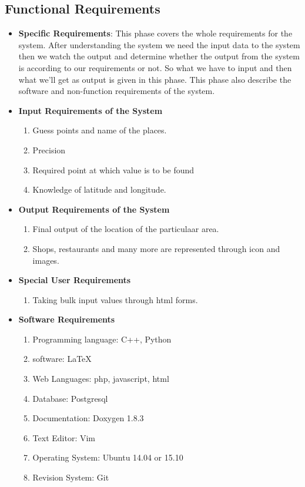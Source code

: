 \subsection{Functional Requirements}
\begin{itemize}
\item {\bf Specific Requirements}: This phase covers the whole requirements
for the system. After understanding the system we need the input data
to the system then we watch the output and determine whether the output
from the system is according to our requirements or not. So what we have
to input and then what we'll get as output is given in this phase. This
phase also describe the software and non-function requirements of the
system.
\item {\bf Input Requirements of the System}
\begin{enumerate}
\item Guess points and name of the places.
\item Precision
\item Required point at which value is to be found
\item Knowledge of latitude and longitude.
\end{enumerate}
\vskip 0.5cm
\item {\bf Output Requirements of the System}
\begin{enumerate}
\item Final output of the location of the particulaar area.
\item Shops, restaurants and many more are represented through icon and images.
\end{enumerate}
\vskip 0.5cm
\item {\bf Special User Requirements}
\begin{enumerate}
\item Taking bulk input values through html forms.
\end{enumerate}
\vskip 0.5cm
\item {\bf Software Requirements}
\begin{enumerate}
\item Programming language: C++, Python
\item software: \LaTeX{}
\item Web Languages: php, javascript, html
\item Database: Postgresql
\item Documentation: Doxygen 1.8.3
\item Text Editor: Vim
\item Operating System: Ubuntu 14.04 or 15.10
\item Revision System: Git


\end{enumerate}
\end{itemize}

